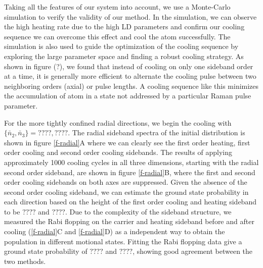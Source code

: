 \documentclass[aps,prl,twocolumn,groupedaddress]{revtex4-1}
\begin{document}
Taking all the features of our system into account, we use a Monte-Carlo simulation to verify
the validity of our method.
In the simulation, we can observe the high heating rate due to the high LD parameters
and confirm our cooling sequence we can
overcome this effect and cool the atom successfully.
The simulation is also used to guide the optimization of the cooling sequence by exploring the
large parameter space and finding a robust cooling strategy. As shown in figure (?),
we found that instead of cooling on only one sideband order at a time, it is generally more
efficient to alternate the cooling pulse between two neighboring orders (axial) or pulse lengths.
A cooling sequence like this minimizes the accumulation of atom in a state not addressed by a
particular Raman pulse parameter.

For the more tightly confined radial directions,
we begin the cooling with $\{\bar n_2, \bar n_3\}=????, ????$.
The radial sideband spectra of the initial distribution is shown in figure \ref{f-radial}A
where we can clearly see the first order heating, first order cooling and
second order cooling sidebands.
The results of applying approximately 1000 cooling cycles in all three dimensions,
starting with the radial second order sideband,
are shown in figure \ref{f-radial}B,
where the first and second order cooling sidebands on both axes are suppressed.
Given the absence of the second order cooling sideband,
we can estimate the ground state probability in each direction based on the height of
the first order cooling and heating sideband to be $????$ and $????$.
Due to the complexity of the sideband structure,
we measured the Rabi flopping on the carrier and heating sideband before and after cooling
(\ref{f-radial}C and \ref{f-radial}D)
as a independent way to obtain the population in different motional states.
Fitting the Rabi flopping data give a ground state probability of $????$ and $????$,
showing good agreement between the two methods.
\end{document}
